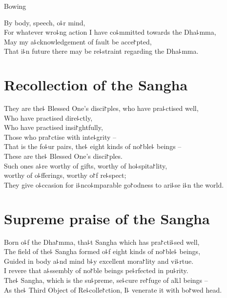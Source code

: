 \clearpage

\begin{instruction}%
  Bowing
\end{instruction}

By body, speech, o꜕r mind,\\
For whatever wro꜕ng action I have co꜕mmitted towards the Dha꜕mma,\\
May my a꜕cknowledgement of fault be acce꜓pted,\\
That i꜕n future there may be re꜕straint regarding the Dha꜕mma.

\chapter{Recollection of the Sangha}%

\begin{leader}
\end{leader}

They are the꜕ Blessed One's disci꜓ples, who have pra꜕ctised well,\\
Who have practised dire꜕ctly,\\
Who have practised insi꜓ghtfully,\\
Those who pra꜓ctise with inte꜕grity --\\
That is the fo꜕ur pairs, the꜕ eight kinds of no꜓ble꜕ beings --\\
These are the꜕ Blessed One's disci꜓ples.\\
Such ones a꜕re worthy of gifts, worthy of ho꜕spita꜓lity,\\
\vin worthy of o꜕fferings, worthy o꜓f re꜕spect;\\
They give o꜕ccasion for i꜕nco꜕mparable go꜓odness to ari꜕se i꜕n the world.

\chapter{Supreme praise of the Sangha}%

\begin{leader}
\end{leader}

Born o꜕f the Dha꜓mma, tha꜕t Sangha which has pra꜓cti꜕sed well,\\
The field of the꜕ Sangha formed o꜕f eight kinds of no꜓ble꜕ beings,\\
Guided in body a꜕nd mind b꜕y excellent mora꜓lity and vi꜕rtue.\\
I revere that a꜕ssembly of no꜓ble beings pe꜕rfected in pu꜕rity.\\
The꜕ Sangha, which is the su꜕preme, se꜕cure re꜓fuge of al꜖l beings --\\
As the꜕ Third Object of Re꜕colle꜓ction, I꜕ venerate it with bo꜓wed head.

